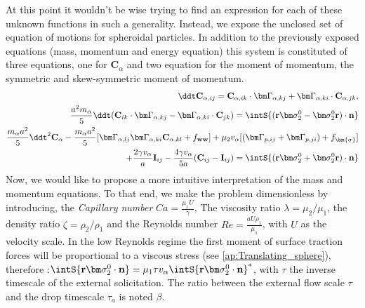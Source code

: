 At this point it wouldn't be wise trying to find an expression for each of these unknown functions in such a generality. 
Instead, we expose the unclosed set of equation of motions for spheroidal particles. 
In addition to the previously exposed equations (mass, momentum and energy equation) this system is constituted of three equations, one for $\textbf{C}_\alpha$ and two equation for the moment of momentum, the symmetric and skew-symmetric moment of momentum. 
\begin{align*}
    \ddt \textbf{C}_{\alpha,ij}
    = \textbf{C}_{\alpha,ik} \cdot \bm\Gamma_{\alpha,kj}
    +  \bm\Gamma_{\alpha,ki} \cdot \textbf{C}_{\alpha,jk},\\
    \frac{a^2  m_\alpha}{5} \ddt( \textbf{C}_{ik} \cdot \bm\Gamma_{\alpha,kj}
    -  \bm\Gamma_{\alpha,ki} \cdot \textbf{C}_{jk})
    =  \intS{(\textbf{r}\bm\sigma_2^0- \bm\sigma_2^0\textbf{r})\cdot \textbf{n}}\\
    \frac{m_\alpha a^2}{5}\ddt^2 \textbf{C}_\alpha
    - \frac{m_\alpha a^2}{5}[
    \bm\Gamma_{\alpha,lj}\bm\Gamma_{\alpha,ki} \textbf{C}_{\alpha,kl} + f_\textbf{ww}]
    + \mu_2 v_\alpha [(\bm \Gamma_{p,ij}+\bm \Gamma_{p,ji})
    + f_{\bm{\sigma}}]\\
    + \frac{2 \gamma v_\alpha }{a} \textbf{I}_{ij} 
    - \frac{4 \gamma v_\alpha }{5 a} (\textbf{C}_{ij} - \textbf{I}_{ij})
    = \intS{(\textbf{r}\bm\sigma_2^0+ \bm\sigma_2^0\textbf{r})\cdot \textbf{n}}
\end{align*}
Now, we would like to propose a more intuitive interpretation of the mass and momentum equations.
To that end, we make the problem dimensionless by introducing, 
the \textit{Capillary number} $Ca= \frac{\mu_1 U}{\gamma}$, The viscosity ratio $\lambda = \mu_2/\mu_1$, the density ratio $\zeta = \rho_2/\rho_1$ and the Reynolds number $Re = \frac{a U \rho_1}{\mu_1}$, with $U$ as the velocity scale. 
In the low Reynolds regime the first moment of surface traction forces will be proportional to a viscous stress (see \ref{ap:Translating_sphere}), therefore :$\intS{\textbf{r}\bm\sigma_2^0\cdot \textbf{n}} =\mu_1  \tau v_\alpha \intS{\textbf{r}\bm\sigma_2^0\cdot \textbf{n}}^*$, with $\tau$ the inverse timescale of the external solicitation.
The ratio between the external flow scale $\tau$ and the drop timescale $\tau_a$ is noted $\beta$. 
